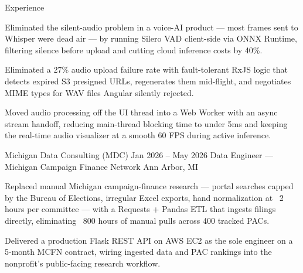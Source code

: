 \documentclass[
	11pt
]{../../template}
\begin{document}
\begin{rSection}{E}{xperience}
\begin{rSectionEntry}
			\item Eliminated the silent-audio problem in a voice-AI product --- most frames sent to Whisper were dead air --- by running Silero VAD client-side via ONNX Runtime, filtering silence before upload and cutting cloud inference costs by 40\%.
			\item Eliminated a 27\% audio upload failure rate with fault-tolerant RxJS logic that detects expired S3 presigned URLs, regenerates them mid-flight, and negotiates MIME types for WAV files Angular silently rejected.
			\item Moved audio processing off the UI thread into a Web Worker with an async stream handoff, reducing main-thread blocking time to under 5ms and keeping the real-time audio visualizer at a smooth 60 FPS during active inference.
		\end{rSectionEntry}

		\begin{rSectionEntry}
			{Michigan Data Consulting (MDC)}
			{Jan 2026 -- May 2026}
			{Data Engineer --- Michigan Campaign Finance Network}
			{}
			{Ann Arbor, MI}

			\item Replaced manual Michigan campaign-finance research --- portal searches capped by the Bureau of Elections, irregular Excel exports, hand normalization at ~2 hours per committee --- with a Requests + Pandas ETL that ingests filings directly, eliminating ~800 hours of manual pulls across 400 tracked PACs.
			\item Delivered a production Flask REST API on AWS EC2 as the sole engineer on a 5-month MCFN contract, wiring ingested data and PAC rankings into the nonprofit's public-facing research workflow.
		\end{rSectionEntry}
	\end{rSection}
\end{document}
